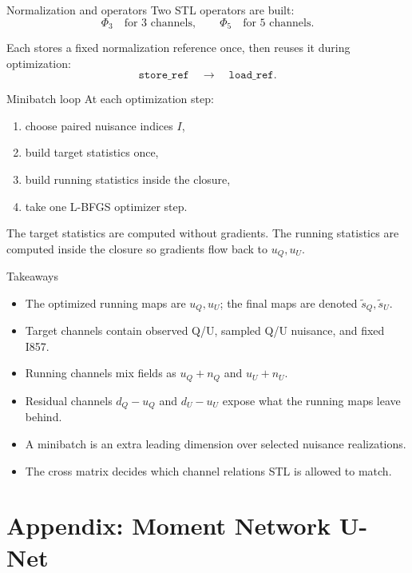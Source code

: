 \documentclass[aspectratio=169,11pt]{beamer}
\begin{document}
\begin{frame}[fragile]{Normalization and operators}
Two STL operators are built:
\[
  \Phi_3 \quad\text{for 3 channels},\qquad
  \Phi_5 \quad\text{for 5 channels}.
\]

\vspace{0.25em}
Each stores a fixed normalization reference once, then reuses it during optimization:
\[
  \texttt{store\_ref}\quad\rightarrow\quad\texttt{load\_ref}.
\]
\end{frame}

\begin{frame}[fragile]{Minibatch loop}
At each optimization step:
\begin{enumerate}
  \item choose paired nuisance indices $I$,
  \item build target statistics once,
  \item build running statistics inside the closure,
  \item take one L-BFGS optimizer step.
\end{enumerate}

\vspace{0.25em}
The target statistics are computed without gradients.
The running statistics are computed inside the closure so gradients flow back to $u_Q,u_U$.
\end{frame}

\begin{frame}[fragile]{Takeaways}
\begin{itemize}
  \item The optimized running maps are $u_Q,u_U$; the final maps are denoted $\tilde s_Q,\tilde s_U$.
  \item Target channels contain observed Q/U, sampled Q/U nuisance, and fixed I857.
  \item Running channels mix fields as $u_Q+n_Q$ and $u_U+n_U$.
  \item Residual channels $d_Q-u_Q$ and $d_U-u_U$ expose what the running maps leave behind.
  \item A minibatch is an extra leading dimension over selected nuisance realizations.
  \item The cross matrix decides which channel relations STL is allowed to match.
\end{itemize}
\end{frame}

\appendix
\section{Appendix: Moment Network U-Net}
\end{document}
